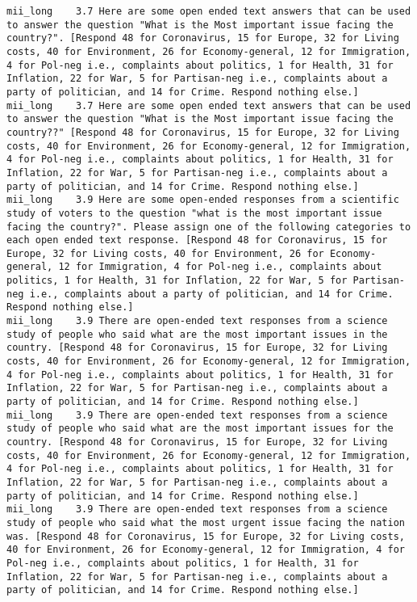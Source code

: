 \begin{lstlisting}[label=lst:promptvariants]
mii_long	3.7	Here are some open ended text answers that can be used to answer the question "What is the Most important issue facing the country?". [Respond 48 for Coronavirus, 15 for Europe, 32 for Living costs, 40 for Environment, 26 for Economy-general, 12 for Immigration, 4 for Pol-neg i.e., complaints about politics, 1 for Health, 31 for Inflation, 22 for War, 5 for Partisan-neg i.e., complaints about a party of politician, and 14 for Crime. Respond nothing else.]
mii_long	3.7	Here are some open ended text answers that can be used to answer the question "What is the Most important issue facing the country??" [Respond 48 for Coronavirus, 15 for Europe, 32 for Living costs, 40 for Environment, 26 for Economy-general, 12 for Immigration, 4 for Pol-neg i.e., complaints about politics, 1 for Health, 31 for Inflation, 22 for War, 5 for Partisan-neg i.e., complaints about a party of politician, and 14 for Crime. Respond nothing else.]
mii_long	3.9	Here are some open-ended responses from a scientific study of voters to the question "what is the most important issue facing the country?". Please assign one of the following categories to each open ended text response. [Respond 48 for Coronavirus, 15 for Europe, 32 for Living costs, 40 for Environment, 26 for Economy-general, 12 for Immigration, 4 for Pol-neg i.e., complaints about politics, 1 for Health, 31 for Inflation, 22 for War, 5 for Partisan-neg i.e., complaints about a party of politician, and 14 for Crime. Respond nothing else.]
mii_long	3.9	There are open-ended text responses from a science study of people who said what are the most important issues in the country. [Respond 48 for Coronavirus, 15 for Europe, 32 for Living costs, 40 for Environment, 26 for Economy-general, 12 for Immigration, 4 for Pol-neg i.e., complaints about politics, 1 for Health, 31 for Inflation, 22 for War, 5 for Partisan-neg i.e., complaints about a party of politician, and 14 for Crime. Respond nothing else.]
mii_long	3.9	There are open-ended text responses from a science study of people who said what are the most important issues for the country. [Respond 48 for Coronavirus, 15 for Europe, 32 for Living costs, 40 for Environment, 26 for Economy-general, 12 for Immigration, 4 for Pol-neg i.e., complaints about politics, 1 for Health, 31 for Inflation, 22 for War, 5 for Partisan-neg i.e., complaints about a party of politician, and 14 for Crime. Respond nothing else.]
mii_long	3.9	There are open-ended text responses from a science study of people who said what the most urgent issue facing the nation was. [Respond 48 for Coronavirus, 15 for Europe, 32 for Living costs, 40 for Environment, 26 for Economy-general, 12 for Immigration, 4 for Pol-neg i.e., complaints about politics, 1 for Health, 31 for Inflation, 22 for War, 5 for Partisan-neg i.e., complaints about a party of politician, and 14 for Crime. Respond nothing else.]

\end{lstlisting}
